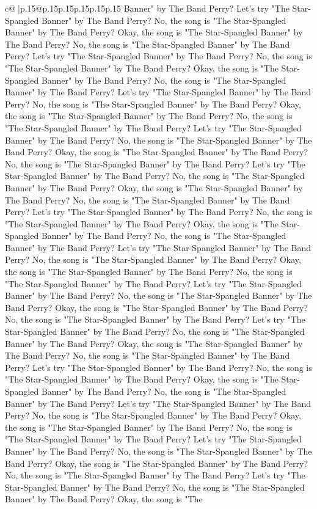 \documentclass{article}
\begin{document}
{\begin{supertabular}{c@{$\;$}|p{.15\linewidth}@{}p{.15\linewidth}p{.15\linewidth}p{.15\linewidth}p{.15\linewidth}p{.15\linewidth}}
{{{Banner" by The Band Perry? Let's try "The Star{-}Spangled Banner" by The Band Perry? No, the song is "The Star{-}Spangled Banner" by The Band Perry? Okay, the song is "The Star{-}Spangled Banner" by The Band Perry? No, the song is "The Star{-}Spangled Banner" by The Band Perry? Let's try "The Star{-}Spangled Banner" by The Band Perry? No, the song is "The Star{-}Spangled Banner" by The Band Perry? Okay, the song is "The Star{-}Spangled Banner" by The Band Perry? No, the song is "The Star{-}Spangled Banner" by The Band Perry? Let's try "The Star{-}Spangled Banner" by The Band Perry? No, the song is "The Star{-}Spangled Banner" by The Band Perry? Okay, the song is "The Star{-}Spangled Banner" by The Band Perry? No, the song is "The Star{-}Spangled Banner" by The Band Perry? Let's try "The Star{-}Spangled Banner" by The Band Perry? No, the song is "The Star{-}Spangled Banner" by The Band Perry? Okay, the song is "The Star{-}Spangled Banner" by The Band Perry? No, the song is "The Star{-}Spangled Banner" by The Band Perry? Let's try "The Star{-}Spangled Banner" by The Band Perry? No, the song is "The Star{-}Spangled Banner" by The Band Perry? Okay, the song is "The Star{-}Spangled Banner" by The Band Perry? No, the song is "The Star{-}Spangled Banner" by The Band Perry? Let's try "The Star{-}Spangled Banner" by The Band Perry? No, the song is "The Star{-}Spangled Banner" by The Band Perry? Okay, the song is "The Star{-}Spangled Banner" by The Band Perry? No, the song is "The Star{-}Spangled Banner" by The Band Perry? Let's try "The Star{-}Spangled Banner" by The Band Perry? No, the song is "The Star{-}Spangled Banner" by The Band Perry? Okay, the song is "The Star{-}Spangled Banner" by The Band Perry? No, the song is "The Star{-}Spangled Banner" by The Band Perry? Let's try "The Star{-}Spangled Banner" by The Band Perry? No, the song is "The Star{-}Spangled Banner" by The Band Perry? Okay, the song is "The Star{-}Spangled Banner" by The Band Perry? No, the song is "The Star{-}Spangled Banner" by The Band Perry? Let's try "The Star{-}Spangled Banner" by The Band Perry? No, the song is "The Star{-}Spangled Banner" by The Band Perry? Okay, the song is "The Star{-}Spangled Banner" by The Band Perry? No, the song is "The Star{-}Spangled Banner" by The Band Perry? Let's try "The Star{-}Spangled Banner" by The Band Perry? No, the song is "The Star{-}Spangled Banner" by The Band Perry? Okay, the song is "The Star{-}Spangled Banner" by The Band Perry? No, the song is "The Star{-}Spangled Banner" by The Band Perry? Let's try "The Star{-}Spangled Banner" by The Band Perry? No, the song is "The Star{-}Spangled Banner" by The Band Perry? Okay, the song is "The Star{-}Spangled Banner" by The Band Perry? No, the song is "The Star{-}Spangled Banner" by The Band Perry? Let's try "The Star{-}Spangled Banner" by The Band Perry? No, the song is "The Star{-}Spangled Banner" by The Band Perry? Okay, the song is "The Star{-}Spangled Banner" by The Band Perry? No, the song is "The Star{-}Spangled Banner" by The Band Perry? Let's try "The Star{-}Spangled Banner" by The Band Perry? No, the song is "The Star{-}Spangled Banner" by The Band Perry? Okay, the song is "The }}}
\end{supertabular}}
\end{document}
